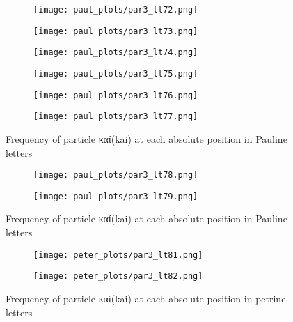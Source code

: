 \documentclass[a4paper]{article}
\begin{document}
\begin{figure}
\ContinuedFloat
\begin{subfigure}{0.45\textwidth}
\centering
\texttt{[image: paul\_plots/par3\_lt72.png]}
\end{subfigure}
\begin{subfigure}{0.45\textwidth}
\centering
\texttt{[image: paul\_plots/par3\_lt73.png]}
\end{subfigure}
\begin{subfigure}{0.45\textwidth}
\centering
\texttt{[image: paul\_plots/par3\_lt74.png]}
\end{subfigure}
\begin{subfigure}{0.45\textwidth}
\centering
\texttt{[image: paul\_plots/par3\_lt75.png]}
\end{subfigure}
\begin{subfigure}{0.45\textwidth}
\centering
\texttt{[image: paul\_plots/par3\_lt76.png]}
\end{subfigure}
\begin{subfigure}{0.45\textwidth}
\centering
\texttt{[image: paul\_plots/par3\_lt77.png]}
\end{subfigure}
\caption{Frequency of particle \textgreek{καί}(kai) at each absolute position in Pauline letters}
\end{figure}

\begin{figure}
\ContinuedFloat
\begin{subfigure}{0.45\textwidth}
\centering
\texttt{[image: paul\_plots/par3\_lt78.png]}
\end{subfigure}
\begin{subfigure}{0.45\textwidth}
\centering
\texttt{[image: paul\_plots/par3\_lt79.png]}
\end{subfigure}
\caption{Frequency of particle \textgreek{καί}(kai) at each absolute position in Pauline letters}
\end{figure}

\begin{figure}
\begin{subfigure}{0.45\textwidth}
\centering
\texttt{[image: peter\_plots/par3\_lt81.png]}
\end{subfigure}
\begin{subfigure}{0.45\textwidth}
\centering
\texttt{[image: peter\_plots/par3\_lt82.png]}
\end{subfigure}
\caption{Frequency of particle \textgreek{καί}(kai) at each absolute position in petrine letters}
\label{peter_kai}
\end{figure}
\end{document}
